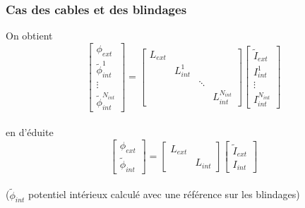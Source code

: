 \begin{frame}
\frametitle{Cas des cables et des blindages}
On obtient
\[ \left[ \begin{array} {c}
\phi_{ext} \\
\tilde{\phi}^1_{int}  \\
\vdots \\
\tilde{\phi}^{N_{int}}_{int} \end{array}  \right]  = 
\left[ \begin{array} {cccc}
L_{ext} & & & \\
  & L^1_{int}& &  \\
 & &\ddots &  \\
 & & & L^{N_{int}}_{int} \end{array}  \right]
 \left[ \begin{array} {c}
\tilde{I}_{ext} \\
I^1_{int}  \\
\vdots \\
I^{N_{int}}_{int} \end{array}  \right] 
\] \\[0.6cm]
en d'\'eduite
\[ \left[ \begin{array} {c}
\phi_{ext} \\
\tilde{\phi}_{int} \end{array}  \right]  = 
\left[ \begin{array} {cc}
L_{ext} & \\
  & L_{int}  \end{array}  \right]
 \left[ \begin{array} {c}
\tilde{I}_{ext} \\
I_{int} \end{array}  \right] 
\] \\[0.6cm]
($\tilde{\phi}_{int}$ potentiel int\'erieux calcul\'e avec une r\'ef\'erence sur les blindages)

\end{frame}

